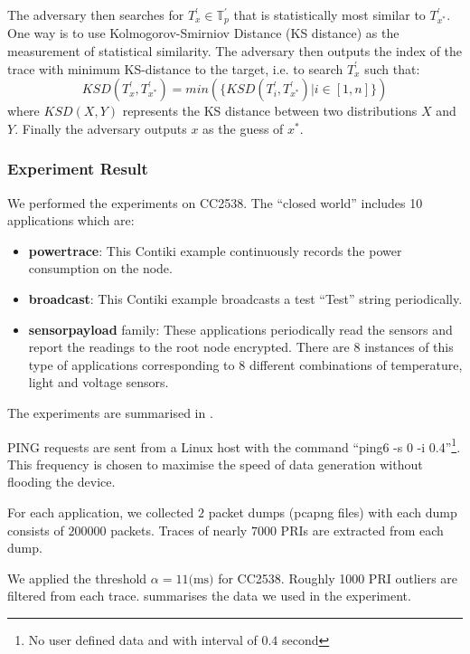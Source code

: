\begin{description}
	The adversary then searches for $T^{\prime}_{x} \in \mathbb{T}^{\prime}_p$ that is statistically most similar to $T^{\prime}_{x^*}$. One way is to use Kolmogorov-Smirniov Distance (KS distance) as the measurement of statistical similarity. The adversary then  outputs the index of the trace with minimum KS-distance to the target, i.e. to search $T^{\prime}_x$ such that:
	\begin{equation}
		KSD( T^{\prime}_{x}, T^{\prime}_{x^*}) = min(\{KSD(T^{\prime}_i, T^{\prime}_{x^*}) | i \in [1,n]\})
	\end{equation}
	where $KSD(X, Y)$ represents the KS distance between two distributions $X$ and $Y$.	Finally the adversary outputs $x$ as the guess of $x^*$.
\end{description}

\subsubsection{Experiment Result}

We performed the experiments on CC2538. The ``closed world'' includes 10 applications which are:
\begin{itemize}
	\item \textbf{powertrace}: This Contiki example continuously records the power consumption on the node.
	\item \textbf{broadcast}: This Contiki example broadcasts a test ``Test'' string periodically.
	\item \textbf{sensorpayload} family: These applications periodically read the sensors and report the readings to the root node encrypted. There are $8$ instances of this type of applications corresponding to $8$ different combinations of temperature, light and voltage sensors.
\end{itemize}

The experiments are summarised in .

PING requests are sent from a Linux host with the command  ``ping6 -s 0 -i 0.4''\footnote{No user defined data and with interval of $0.4$ second}. This frequency is chosen to maximise the speed of data generation without flooding the device.

For each application, we collected $2$ packet dumps (pcapng files) with each dump consists of $200000$ packets. Traces of nearly $7000$ PRIs are extracted from each dump.

We applied the threshold $\alpha = 11\text{(ms)}$ for CC2538. Roughly 1000 PRI outliers are filtered from each trace.  summarises the data we used in the experiment.

